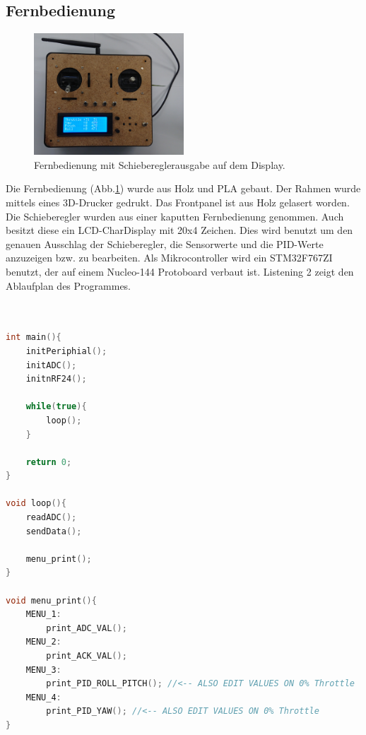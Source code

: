 \documentclass[12pt,a4paper, ngerman]{article}
\begin{document}
\subsection{Fernbedienung}
\begin{figure}
\centering
\includegraphics[width=0.5\textwidth]{Ferni.JPG}
\caption[]{Fernbedienung mit Schiebereglerausgabe auf dem Display.} \label{ferni}
\end{figure}
Die Fernbedienung (Abb.\ref{ferni}) wurde aus Holz und PLA gebaut. Der Rahmen wurde mittels eines 3D-Drucker gedrukt. Das Frontpanel ist aus Holz gelasert worden. Die Schieberegler wurden aus einer kaputten Fernbedienung genommen. Auch besitzt diese ein LCD-CharDisplay mit 20x4 Zeichen. Dies wird benutzt um den genauen Ausschlag der Schieberegler, die Sensorwerte und die PID-Werte anzuzeigen bzw. zu bearbeiten. Als Mikrocontroller wird ein STM32F767ZI benutzt, der auf einem Nucleo-144 Protoboard verbaut ist. Listening 2 zeigt den Ablaufplan des Programmes.\\ \\ \\
\begin{lstlisting}[language=C++,caption=Programmablauf Pseudocode]
int main(){
	initPeriphial();
	initADC();
	initnRF24();

	while(true){
		loop();
	}
	
	return 0;
}

void loop(){
	readADC();
	sendData();
	
	menu_print();
}

void menu_print(){
	MENU_1:
		print_ADC_VAL();
	MENU_2:
		print_ACK_VAL();
	MENU_3:
		print_PID_ROLL_PITCH(); //<-- ALSO EDIT VALUES ON 0% Throttle
	MENU_4:
		print_PID_YAW(); //<-- ALSO EDIT VALUES ON 0% Throttle
}


\end{lstlisting}
\newpage
\end{document}
